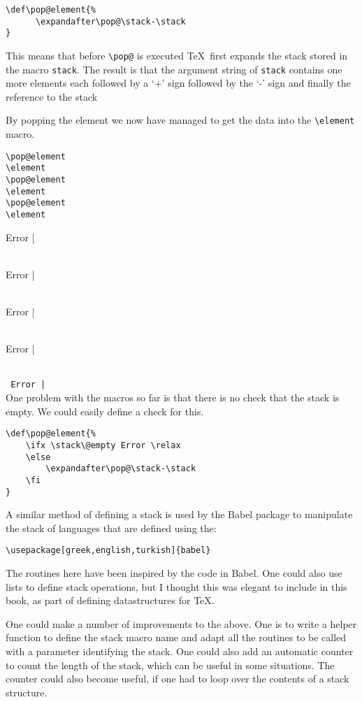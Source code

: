 \documentclass{book}
\begin{document}
\begin{verbatim}
\def\pop@element{%
      \expandafter\pop@\stack-\stack
}
\end{verbatim}


\def\pop@element{%
\ifx \stack\@empty  Error\relax \else
  \expandafter\pop@\stack|\stack
\fi
}
This means that before \verb+\pop@+ is executed \TeX\ first expands the stack stored in the macro \verb+stack+. The result is that the argument string of \verb+stack+ contains one more elements each followed by a `+' sign followed by the `-' sign and finally the reference to the stack

By popping the element we now have managed to get the data into the \verb+\element+ macro.

\begin{verbatim}
\pop@element
\element
\pop@element
\element
\pop@element
\element
\end{verbatim}
\pop@element
\noindent\texttt{\element}\\
\pop@element
\noindent\texttt{\element}\\
\pop@element
\noindent\texttt{\element}\\
\pop@element
\noindent\texttt{\element}\\
\noindent\texttt{\pop@element}\\

One problem with the macros so far is that there is no check that the stack is empty. We could easily define a check for this.

\begin{verbatim}
\def\pop@element{%
    \ifx \stack\@empty Error \relax 
    \else
        \expandafter\pop@\stack-\stack
    \fi
}
\end{verbatim}


A similar method of defining a stack is used by the Babel package to manipulate the stack of languages that are defined using the:

\begin{verbatim}
\usepackage[greek,english,turkish]{babel}
\end{verbatim}

The routines here have been inspired by the code in Babel. One could also use lists to define stack operations, but I thought this was elegant to include in this book, as part of defining datastructures for \TeX.

One could make a number of improvements to the above. One is to write a helper function to define the stack macro name and adapt all the routines to be called with a parameter identifying the stack. One could also add an automatic counter to count the length of the stack, which can be useful in some situations. The counter could also become useful, if one had to loop over the contents of a stack structure.
\end{document}
